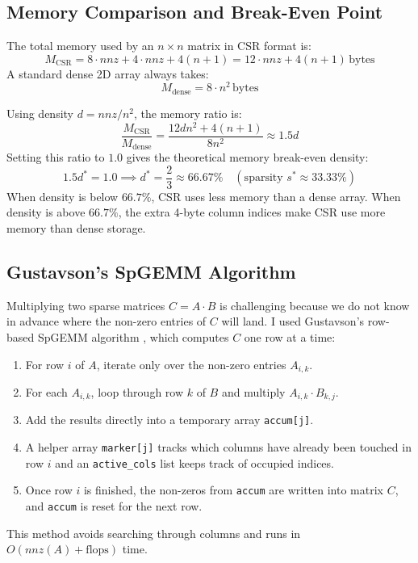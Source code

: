 \documentclass[10pt,conference,a4paper]{IEEEtran}
\begin{document}
\subsection{Memory Comparison and Break-Even Point}
The total memory used by an $n \times n$ matrix in CSR format is:
\begin{equation}
M_{\text{CSR}} = 8 \cdot nnz + 4 \cdot nnz + 4(n + 1) = 12 \cdot nnz + 4(n + 1)\,\text{bytes}
\end{equation}
A standard dense 2D array always takes:
\begin{equation}
M_{\text{dense}} = 8 \cdot n^2\,\text{bytes}
\end{equation}

Using density $d = nnz / n^2$, the memory ratio is:
\begin{equation}
\frac{M_{\text{CSR}}}{M_{\text{dense}}} = \frac{12 d n^2 + 4(n+1)}{8 n^2} \approx 1.5 d
\end{equation}
Setting this ratio to $1.0$ gives the theoretical memory break-even density:
\begin{equation}
1.5 d^* = 1.0 \implies d^* = \frac{2}{3} \approx 66.67\% \quad (\text{sparsity } s^* \approx 33.33\%)
\end{equation}
When density is below $66.7\%$, CSR uses less memory than a dense array. 
When density is above $66.7\%$, the extra 4-byte column indices make CSR use more memory than dense storage.

\subsection{Gustavson's SpGEMM Algorithm}
Multiplying two sparse matrices $C = A \cdot B$ is challenging because we do not know in advance where the non-zero entries of $C$ will land. 
I used Gustavson's row-based SpGEMM algorithm \cite{gustavson1978}, which computes $C$ one row at a time:
\begin{enumerate}
    \item For row $i$ of $A$, iterate only over the non-zero entries $A_{i,k}$.
    \item For each $A_{i,k}$, loop through row $k$ of $B$ and multiply $A_{i,k} \cdot B_{k,j}$.
    \item Add the results directly into a temporary array \texttt{accum[j]}.
    \item A helper array \texttt{marker[j]} tracks which columns have already been touched in row $i$ and an \texttt{active\_cols} list keeps track of occupied indices.
    \item Once row $i$ is finished, the non-zeros from \texttt{accum} are written into matrix $C$, and \texttt{accum} is reset for the next row.
\end{enumerate}
This method avoids searching through columns and runs in $O(nnz(A) + \text{flops})$ time.
\end{document}
